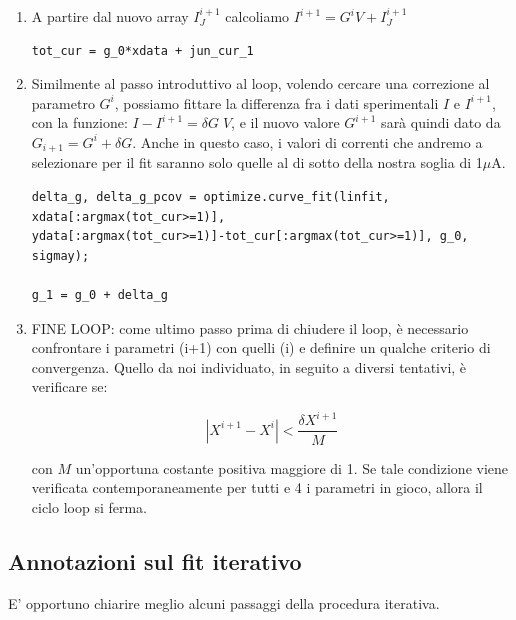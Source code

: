 \documentclass[a4paper]{article}
\begin{document}
\begin{enumerate}
\item A partire dal nuovo array $I_{J}^{i+1}$ calcoliamo $I^{i+1} = G^i V + I_{J}^{i+1}$

\begin{lstlisting}
tot_cur = g_0*xdata + jun_cur_1
\end{lstlisting}

\item Similmente al passo introduttivo al loop, volendo cercare una correzione al parametro $G^i$, possiamo fittare la differenza fra i dati sperimentali $I$ e $I^{i+1}$, con la funzione: $I - I^{i+1} = \delta G \; V$, e il nuovo valore $G^{i+1}$ sarà quindi dato da $G_{i+1} = G^i +\delta G$. Anche in questo caso, i valori di correnti che andremo a selezionare per il fit saranno solo quelle al di sotto della nostra soglia di 1$\mu$A.

\begin{lstlisting}
delta_g, delta_g_pcov = optimize.curve_fit(linfit, xdata[:argmax(tot_cur>=1)],
ydata[:argmax(tot_cur>=1)]-tot_cur[:argmax(tot_cur>=1)], g_0, sigmay);

g_1 = g_0 + delta_g
\end{lstlisting} 

\item FINE LOOP: come ultimo passo prima di chiudere il loop, è necessario confrontare i parametri (i+1) con quelli (i) e definire un qualche criterio di convergenza. Quello da noi individuato, in seguito a diversi tentativi, è verificare se:

\begin{equation}
\left| X^{i+1} - X^{i}  \right| < \frac{\delta X^{i+1}}{M}
\end{equation}

con $M$ un'opportuna costante positiva maggiore di 1. Se tale condizione viene verificata contemporaneamente per tutti e 4 i parametri in gioco, allora il ciclo loop si ferma.

\end{enumerate}

\subsection{Annotazioni sul fit iterativo}
E' opportuno chiarire meglio alcuni passaggi della procedura iterativa.\\
\end{document}
